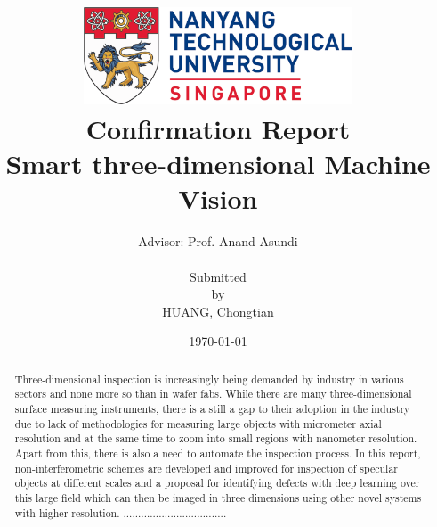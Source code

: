 \documentclass[11pt]{report}
\title{\includegraphics[width=0.6\textwidth]{figures/ntu_logo.png}\\ Confirmation Report \\ Smart three-dimensional Machine Vision}
\author{Advisor: Prof. Anand Asundi\\ \\ Submitted \\by \\HUANG, Chongtian}
\date{\today}
\begin{document}
\maketitle

\tableofcontents

\begin{abstract}
Three-dimensional inspection is increasingly being demanded by industry in various sectors and none more so than in wafer fabs. While there are many three-dimensional surface measuring instruments, there is a still a gap to their adoption in the industry due to lack of methodologies for measuring large objects with micrometer axial resolution and at the same time to zoom into small regions with nanometer resolution. Apart from this, there is also a need to automate the inspection process. In this report, non-interferometric schemes are developed and improved for inspection of specular objects at different scales and a proposal for identifying defects with deep learning over this large field which can then be imaged in three dimensions using other novel systems with higher resolution.
 ...................................
\end{abstract}




\end{document}
